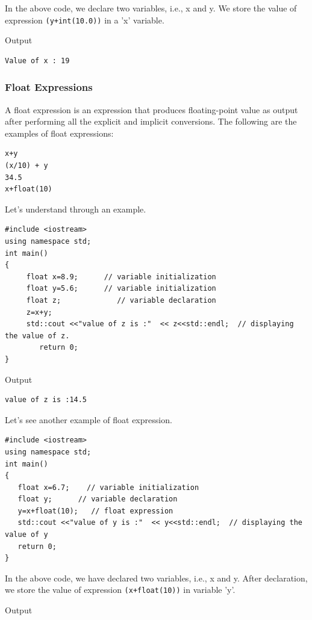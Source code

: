 \documentclass{book}
\begin{document}
In the above code, we declare two variables, i.e., x and y. We store the value of expression \texttt{(y+int(10.0))} in a 'x' variable.

Output

\begin{lstlisting}
Value of x : 19
\end{lstlisting}

\subsubsection{Float Expressions}

A float expression is an expression that produces floating-point value as output after performing all the explicit and implicit conversions. The following are the examples of float expressions:

\begin{lstlisting}
x+y  
(x/10) + y  
34.5  
x+float(10)  
\end{lstlisting}

Let's understand through an example.

\begin{lstlisting}
#include <iostream>  
using namespace std;  
int main()  
{  
	 float x=8.9;      // variable initialization  
	 float y=5.6;      // variable initialization  
	 float z;             // variable declaration  
	 z=x+y;  
	 std::cout <<"value of z is :"  << z<<std::endl;  // displaying the value of z.  
		return 0;  
}  
\end{lstlisting}

Output

\begin{Verbatim}
value of z is :14.5
\end{Verbatim}
       
Let's see another example of float expression.

\begin{lstlisting}
#include <iostream>  
using namespace std;  
int main()  
{  
   float x=6.7;    // variable initialization  
   float y;      // variable declaration  
   y=x+float(10);   // float expression  
   std::cout <<"value of y is :"  << y<<std::endl;  // displaying the value of y  
   return 0;  
}  
\end{lstlisting}

In the above code, we have declared two variables, i.e., x and y. After declaration, we store the value of expression \texttt{(x+float(10))} in variable 'y'.

Output
\end{document}
